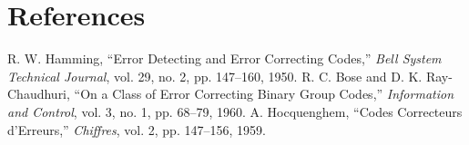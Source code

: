 \documentclass[conference]{IEEEtran}
\begin{document}
\section*{References}
\begin{thebibliography}{1}
 R. W. Hamming, ``Error Detecting and Error Correcting Codes,'' \emph{Bell System Technical Journal}, vol. 29, no. 2, pp. 147--160, 1950.
 R. C. Bose and D. K. Ray-Chaudhuri, ``On a Class of Error Correcting Binary Group Codes,'' \emph{Information and Control}, vol. 3, no. 1, pp. 68--79, 1960.
 A. Hocquenghem, ``Codes Correcteurs d'Erreurs,'' \emph{Chiffres}, vol. 2, pp. 147--156, 1959.
\end{thebibliography}
\end{document}
